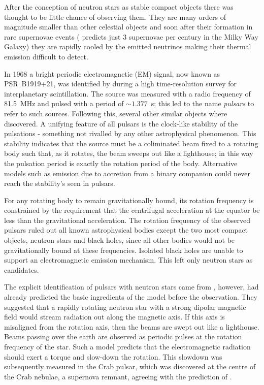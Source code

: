 After the conception of neutron stars as stable compact objects there was
thought to be little chance of observing them. They are many orders of
magnitude smaller than other celestial objects and soon after their formation
in rare supernovae events (\citet{van1991} predicts just 3 supernovae per
century in the Milky Way Galaxy)
they are rapidly cooled by the emitted neutrinos
making their thermal emission difficult to detect.

In 1968 a bright periodic electromagnetic (EM) signal, now known as PSR~B1919+21, was identified
by \citet{Hewish1968} during a high time-resolution survey for interplanetary
scintillation. The source was measured with a radio frequency of 81.5~MHz
and pulsed with a period of $\sim 1.377$~s; this led to the name \emph{pulsars}
to refer to such sources.  Following this, several other similar objects where
discovered. A unifying feature of all pulsars is the clock-like stability of
the pulsations - something not rivalled by any other astrophysical phenomenon.
This stability indicates that the source must be a coliminated beam fixed to a
rotating body such that, as it rotates, the beam sweeps out like a lighthouse;
in this way the pulsation period is exactly the rotation period of the body.
Alternative models such as emission due to accretion from a binary companion
could never reach the stability's seen in pulsars.

For any rotating body to remain gravitationally bound, its rotation frequency is
constrained by the requirement that the centrifugal acceleration at the equator
be less than the gravitational acceleration. The rotation frequency of the observed
pulsars ruled out all known astrophysical bodies except the two most compact
objects, neutron stars and black holes, since all other bodies would not be
gravitationally bound at these frequencies. Isolated black holes are unable to
support an electromagnetic emission mechanism. This left only neutron stars
as candidates.

The explicit identification of pulsars with neutron stars came from
\citet{Gold1968}, however, \citet{Pacini1967} had already predicted the basic
ingredients of the model before the observation. They suggested that a rapidly
rotating neutron star with a strong dipolar magnetic field would stream
radiation out along the magnetic axis. If this axis is misaligned from the
rotation axis, then the beams are swept out like a lighthouse. Beams passing
over the earth are observed as periodic pulses at the rotation frequency of the
star.  Such a model predicts that the electromagnetic radiation should exert a
torque and slow-down the rotation.  This slowdown was subsequently measured in
the Crab pulsar, which was discovered at the centre of the Crab nebulae, a
supernova remnant, agreeing with the prediction of \citet{Baade1934}.

